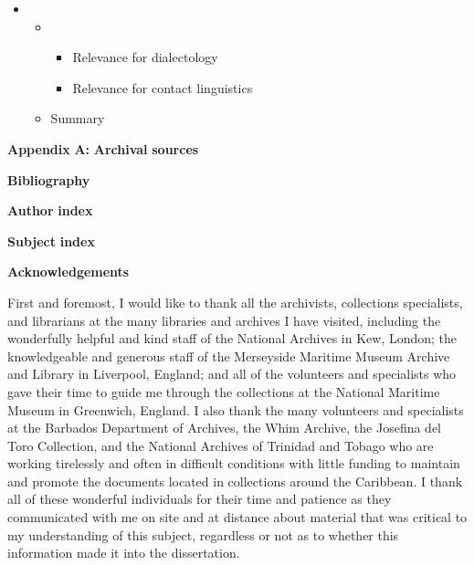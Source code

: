 \setcounter{itemize}{7}
\begin{itemize}
\item \setcounter{itemize}{1}
\begin{itemize}
\item \begin{itemize}
\item \begin{styleListParagraph}
Relevance for dialectology
\end{styleListParagraph}
\item \begin{styleListParagraph}
Relevance for contact linguistics
\end{styleListParagraph}
\end{itemize}
\item \begin{styleListParagraph}
Summary 
\end{styleListParagraph}
\end{itemize}
\end{itemize}

\textbf{Appendix} \textbf{A:} \textbf{Archival} \textbf{sources} 

\textbf{Bibliography} 

\textbf{Author} \textbf{index}

\textbf{Subject} \textbf{index}

\textbf{Acknowledgements}

First and foremost, I would like to thank all the archivists, collections specialists, and librarians at the many libraries and archives I have visited, including the wonderfully helpful and kind staff of the National Archives in Kew, London; the knowledgeable and generous staff of the Merseyside Maritime Museum Archive and Library in Liverpool, England; and all of the volunteers and specialists who gave their time to guide me through the collections at the National Maritime Museum in Greenwich, England. I also thank the many volunteers and specialists at the Barbados Department of Archives, the Whim Archive, the Josefina del Toro Collection, and the National Archives of Trinidad and Tobago who are working tirelessly and often in difficult conditions with little funding to maintain and promote the documents located in collections around the Caribbean. I thank all of these wonderful individuals for their time and patience as they communicated with me on site and at distance about material that was critical to my understanding of this subject, regardless or not as to whether this information made it into the dissertation. 


